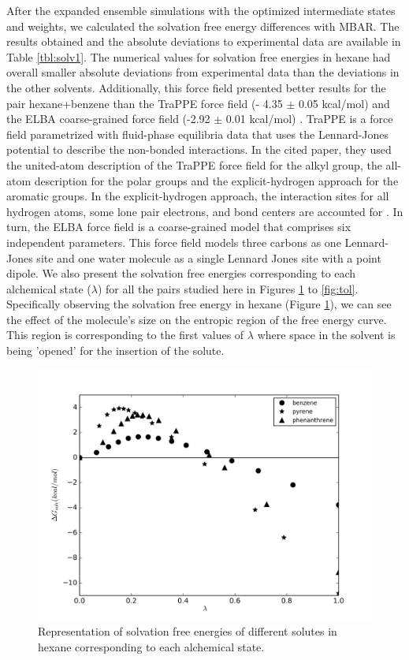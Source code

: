 \documentclass[final,12p,times,twocolumn]{elsarticle}
\begin{document}
	After the expanded ensemble simulations with the optimized intermediate states and weights, we calculated the solvation free energy differences with MBAR. The results obtained and the absolute deviations to experimental data \cite{doi:10.1021/ci034120c} are available  in Table \ref{tbl:solv1}. The numerical values for solvation free energies in hexane had overall smaller absolute deviations from experimental data than the deviations in the other solvents. Additionally, this force field presented better results for the pair hexane+benzene than the TraPPE force field (- 4.35  $\pm$ 0.05 kcal/mol) \cite{garrido2011} and the ELBA coarse-grained force field  (-2.92 $\pm$ 0.01 kcal/mol) \cite{doi:10.1021/acs.jctc.5b00963}. TraPPE is a force field parametrized with fluid-phase equilibria data that uses the Lennard-Jones potential to describe the non-bonded interactions. In the cited paper, they used the united-atom description of the TraPPE force field for the alkyl group, the all-atom description for the polar groups and the explicit-hydrogen approach for the aromatic groups. In the explicit-hydrogen approach, the interaction sites for all hydrogen atoms, some lone pair electrons, and bond centers are accounted for \cite{doi:10.1021/jp073586l}. In turn, the ELBA force field is a coarse-grained model that comprises six independent parameters. This force field models three carbons as one Lennard-Jones site and one water molecule as a single Lennard Jones site with a point dipole. We also present the solvation free energies corresponding to each alchemical state ($\lambda$) for all the pairs studied here in Figures \ref{fig:hex} to \ref{fig:tol}. Specifically observing the solvation free energy in hexane (Figure \ref{fig:hex}), we can see the effect of the molecule's size on the entropic region of the free energy curve. This region is corresponding to the first values of $\lambda$ where space in the solvent is being 'opened' for the insertion of the solute.
	
		\begin{figure}
			\centering
			\includegraphics[width=1.0\linewidth]{Figures/hexart}
			\caption{Representation of solvation free energies of different solutes in hexane corresponding to each alchemical state.}
			\label{fig:hex}
		\end{figure}
		
\end{document}
